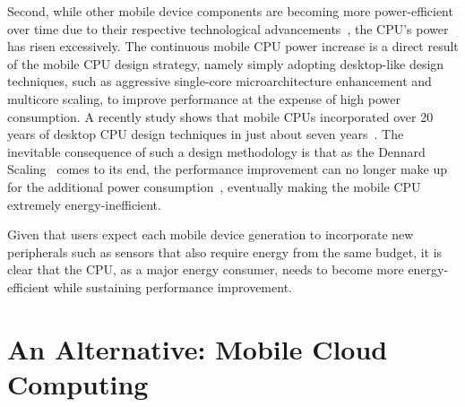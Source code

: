Second, while other mobile device components are becoming more power-efficient over time due to their respective technological advancements~\cite{chen2013energy}, the CPU's power has risen excessively. The continuous mobile CPU power increase is a direct result of the mobile CPU design strategy, namely simply adopting desktop-like design techniques, such as aggressive single-core microarchitecture enhancement and multicore scaling, to improve performance at the expense of high power consumption. A recently study shows that mobile CPUs incorporated over 20 years of desktop CPU design techniques in just about seven years~\cite{mobilecpu}. The inevitable consequence of such a design methodology is that as the Dennard Scaling~\cite{dennard} comes to its end, the performance improvement can no longer make up for the additional power consumption~\cite{mobilecpu}, eventually making the mobile CPU extremely energy-inefficient.

Given that users expect each mobile device generation to incorporate new peripherals such as sensors that also require energy from the same budget, it is clear that the CPU, as a major energy consumer, needs to become more energy-efficient while sustaining performance improvement.

\section{An Alternative: Mobile Cloud Computing}
\label{sec:motivation:alter}















